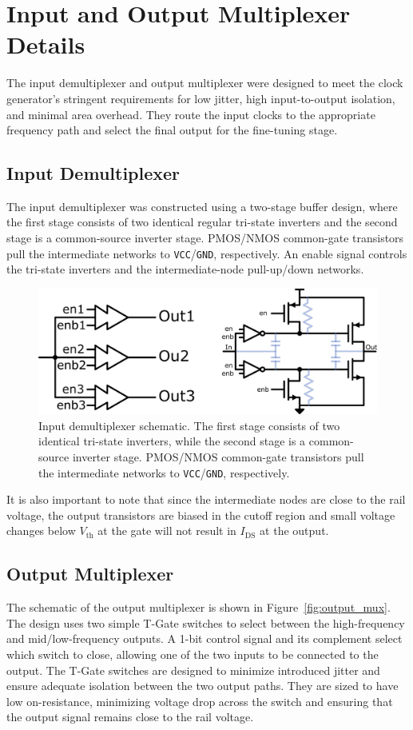 \section{Input and Output Multiplexer Details}
\label{app:mux_details}

The input demultiplexer and output multiplexer were designed to meet the clock generator's stringent requirements for low jitter, high input-to-output isolation, and minimal area overhead. They route the input clocks to the appropriate frequency path and select the final output for the fine-tuning stage.

\subsection{Input Demultiplexer}
The input demultiplexer was constructed using a two-stage buffer design, where the first stage consists of two identical regular tri-state inverters and the second stage is a common-source inverter stage. PMOS/NMOS common-gate transistors pull the intermediate networks to \texttt{VCC}/\texttt{GND}, respectively. An enable signal controls the tri-state inverters and the intermediate-node pull-up/down networks.

\begin{figure}[htbp]
  \centering
  \includegraphics[width=0.8\linewidth]{figures/Schematics/input_demux.png}
  \caption{Input demultiplexer schematic. The first stage consists of two identical tri-state inverters, while the second stage is a common-source inverter stage. PMOS/NMOS common-gate transistors pull the intermediate networks to \texttt{VCC}/\texttt{GND}, respectively.}
  \label{fig:input_demux}
\end{figure}

It is also important to note that since the intermediate nodes are close to the rail voltage, the output transistors are biased in the cutoff region and small voltage changes below \(V_\text{th}\) at the gate will not result in \(I_\text{DS}\) at the output.

\subsection{Output Multiplexer}
The schematic of the output multiplexer is shown in Figure~\ref{fig:output_mux}. The design uses two simple T-Gate switches to select between the high-frequency and mid/low-frequency outputs. A 1-bit control signal and its complement select which switch to close, allowing one of the two inputs to be connected to the output. The T-Gate switches are designed to minimize introduced jitter and ensure adequate isolation between the two output paths. They are sized to have low on-resistance, minimizing voltage drop across the switch and ensuring that the output signal remains close to the rail voltage.

